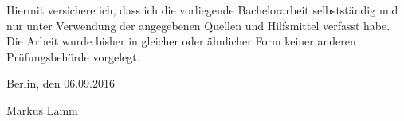 
Hiermit versichere ich, dass ich die vorliegende Bachelorarbeit selbstständig und nur unter
Verwendung der angegebenen Quellen und Hilfsmittel verfasst habe. Die Arbeit wurde bisher
in gleicher oder ähnlicher Form keiner anderen Prüfungsbehörde vorgelegt.

\vskip 1cm

Berlin, den 06.09.2016

\vskip 1.5cm

Markus Lamm